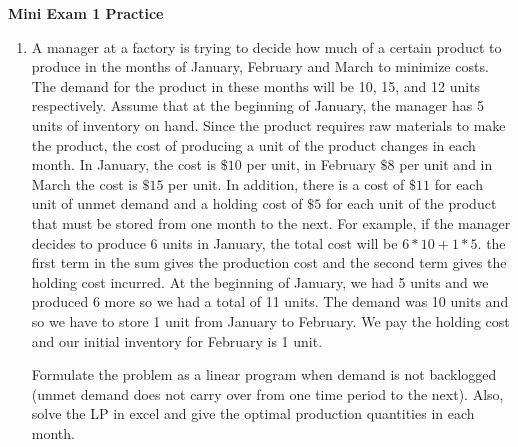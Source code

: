 \documentclass{article}[11 pt]    %
\begin{document}
\begin{center}
\textbf{Mini Exam 1 Practice}\\[.1cm]
\end{center}

\begin{enumerate}
\item A manager at a factory is trying to decide how much of a certain product to produce in the months of January, February and March to minimize costs.  The demand for the product in these months will be 10, 15, and 12 units respectively.  Assume that at the beginning of January, the manager has 5 units of inventory on hand.  Since the product requires raw materials to make the product, the cost of producing a unit  of the product changes in each month.  In January, the cost is $\$10$ per unit, in February $\$8$ per unit and in March the cost is $\$15$ per unit.  In addition, there is a cost of $\$11$ for each unit of unmet demand and a holding cost of $\$5$ for each unit of the product that must be stored from one month to the next.  For example, if the manager decides to produce 6 units in January, the total cost will be $6*10 + 1*5$.  the first term in the sum gives the production cost and the second term gives the holding cost incurred.  At the beginning of January, we had 5 units and we produced 6 more so we had a total of 11 units.  The demand was 10 units and so we have to store 1 unit from January to February.  We pay the holding cost and our initial inventory for February is 1 unit.  

Formulate the problem as a linear program when demand is not backlogged (unmet demand does not carry over from one time period to the next).  Also, solve the LP in excel and give the optimal production quantities in each month. 


\end{enumerate}
\end{document}
